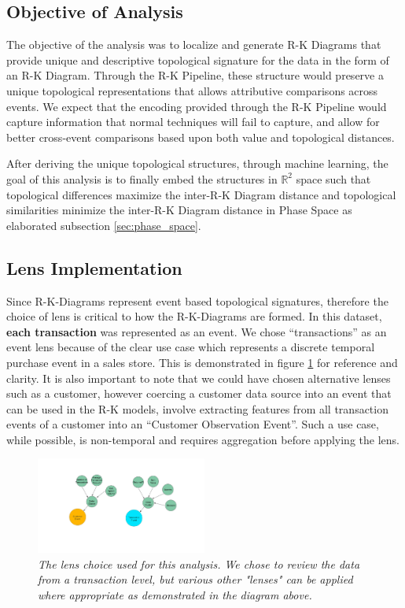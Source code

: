 \subsection{Objective of Analysis}

The objective of the analysis was to localize and generate R-K Diagrams that provide unique and descriptive topological signature for the data in the form of an R-K Diagram. Through the R-K Pipeline, these structure would preserve a unique topological representations that allows attributive comparisons across events. We expect that the encoding provided through the R-K Pipeline would capture information that normal techniques will fail to capture, and allow for better cross-event comparisons based upon both value and topological distances.

After deriving the unique topological structures, through machine learning, the goal of this analysis is to finally embed the structures in $\mathbb{R}^{2}$ space such that topological differences maximize the inter-R-K Diagram distance and topological similarities minimize the inter-R-K Diagram distance in Phase Space as elaborated subsection \ref{sec:phase_space}.

\subsection{Lens Implementation}

Since R-K-Diagrams represent event based topological signatures, therefore the choice of lens is critical to how the R-K-Diagrams are formed. In this dataset, \textbf{each transaction} was represented as an event. We chose ``transactions'' as an event lens because of the clear use case which represents a discrete temporal purchase event in a sales store. This is demonstrated in figure \ref{fig:lens_choise2} for reference and clarity. It is also important to note that we could have chosen alternative lenses such as a customer, however coercing a customer data source into an event that can be used in the R-K models, involve extracting features from all transaction events of a customer into an ``Customer Observation Event''. Such a use case, while possible, is non-temporal and requires aggregation before applying the lens.

\begin{figure}[H]
    \centering
            \includegraphics[width=0.5\textwidth]{images/Lens_Choice2.jpg}
    \caption{\textit{The lens choice used for this analysis. We chose to review the data from a transaction level, but various other "lenses" can be applied where appropriate as demonstrated in the diagram above.}}
    \label{fig:lens_choise2}
\end{figure}

